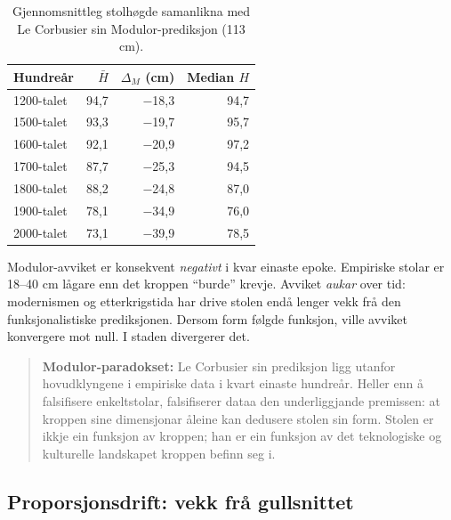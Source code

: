 \documentclass[10pt, a4paper, twocolumn]{article}
\begin{document}
\begin{table}[H]
\centering
\caption{Gjennomsnittleg stolhøgde samanlikna med Le Corbusier sin Modulor-prediksjon (113 cm).}
\label{tab:modulor}
\begin{tabular}{@{}lrrr@{}}
\toprule
\textbf{Hundreår} & \textbf{$\bar{H}$} & \textbf{$\Delta_M$ (cm)} & \textbf{Median $H$} \\
\midrule
1200-talet &  94,7 & $-$18,3 &  94,7 \\
1500-talet &  93,3 & $-$19,7 &  95,7 \\
1600-talet &  92,1 & $-$20,9 &  97,2 \\
1700-talet &  87,7 & $-$25,3 &  94,5 \\
1800-talet &  88,2 & $-$24,8 &  87,0 \\
1900-talet &  78,1 & $-$34,9 &  76,0 \\
2000-talet &  73,1 & $-$39,9 &  78,5 \\
\bottomrule
\end{tabular}
\end{table}

Modulor-avviket er konsekvent \emph{negativt} i kvar einaste epoke. Empiriske stolar er 18--40 cm lågare enn det kroppen ``burde'' krevje. Avviket \emph{aukar} over tid: modernismen og etterkrigstida har drive stolen endå lenger vekk frå den funksjonalistiske prediksjonen. Dersom form følgde funksjon, ville avviket konvergere mot null. I staden divergerer det.

\begin{quote}
\textbf{Modulor-paradokset:} Le Corbusier sin prediksjon ligg utanfor hovudklyngene i empiriske data i kvart einaste hundreår. Heller enn å falsifisere enkeltstolar, falsifiserer dataa den underliggjande premissen: at kroppen sine dimensjonar åleine kan dedusere stolen sin form. Stolen er ikkje ein funksjon av kroppen; han er ein funksjon av det teknologiske og kulturelle landskapet kroppen befinn seg i.
\end{quote}


\subsection{Proporsjonsdrift: vekk frå gullsnittet}
\end{document}
